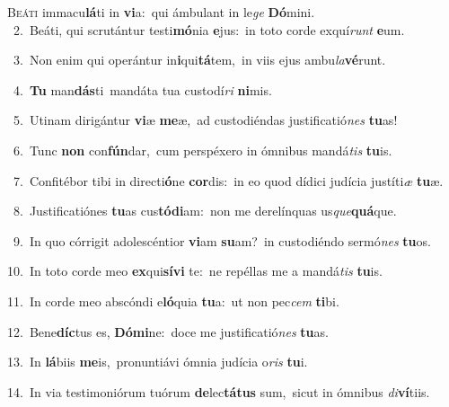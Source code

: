 \lettrine{\initial\textcolor{\initialcolor}{B}}{eáti} immacu\-\textbf{lá}\-ti in \textbf{vi}\-a:~\star qui ámbulant in le\textit{ge} \textbf{Dó}\-mini.\\
{\numbfont\textcolor{\numbcolor}{~2.}}~Beáti, qui scrutántur testi\-\textbf{mó}\-nia \textbf{e}\-jus:~\star in toto corde exquí\textit{runt} \textbf{e}\-um.\par
{\numbfont\textcolor{\numbcolor}{~3.}}~Non enim qui operántur in\-\textbf{i}\-qui\-\textbf{tá}\-tem,~\star in viis ejus ambu\-\textit{la}\-\textbf{vé}runt.\par
{\numbfont\textcolor{\numbcolor}{~4.}}~\textbf{Tu} man\-\textbf{dás}\-ti~\star mandáta tua custodí\textit{ri} \textbf{ni}\-mis.\par
{\numbfont\textcolor{\numbcolor}{~5.}}~Utinam dirigántur \textbf{vi}\-æ \textbf{me}\-æ,~\star ad custodiéndas justificatió\textit{nes} \textbf{tu}\-as!\par
{\numbfont\textcolor{\numbcolor}{~6.}}~Tunc \textbf{non} con\-\textbf{fún}\-dar,~\star cum perspéxero in ómnibus mandá\textit{tis} \textbf{tu}\-is.\par
{\numbfont\textcolor{\numbcolor}{~7.}}~Confitébor tibi in directi\-\textbf{ó}\-ne \textbf{cor}\-dis:~\star in eo quod dídici judícia justíti\textit{æ} \textbf{tu}\-æ.\par
{\numbfont\textcolor{\numbcolor}{~8.}}~Justificatiónes \textbf{tu}\-as cus\-\textbf{tó}\-\textbf{di}am:~\star non me derelínquas us\-\textit{que}\-\textbf{quá}que.\par
{\numbfont\textcolor{\numbcolor}{~9.}}~In quo córrigit adolescéntior \textbf{vi}\-am \textbf{su}\-am?~\star in custodiéndo sermó\textit{nes} \textbf{tu}\-os.\par
{\numbfont\textcolor{\numbcolor}{10.}}~In toto corde meo \textbf{ex}\-qui\-\textbf{sí}\-\textbf{vi} te:~\star ne repéllas me a mandá\textit{tis} \textbf{tu}\-is.\par
{\numbfont\textcolor{\numbcolor}{11.}}~In corde meo abscóndi e\-\textbf{ló}\-quia \textbf{tu}\-a:~\star ut non pec\textit{cem} \textbf{ti}\-bi.\par
{\numbfont\textcolor{\numbcolor}{12.}}~Bene\-\textbf{díc}\-tus es, \textbf{Dó}\-\textbf{mi}ne:~\star doce me justificatió\textit{nes} \textbf{tu}\-as.\par
{\numbfont\textcolor{\numbcolor}{13.}}~In \textbf{lá}\-biis \textbf{me}\-is,~\star pronuntiávi ómnia judícia o\textit{ris} \textbf{tu}\-i.\par
{\numbfont\textcolor{\numbcolor}{14.}}~In via testimoniórum tuórum \textbf{de}\-lec\-\textbf{tá}\-\textbf{tus} sum,~\star sicut in ómnibus \textit{di}\-\textbf{ví}tiis.\par
